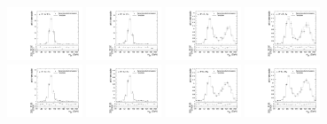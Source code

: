 \begin{figure}[htbp]
  \includegraphics[width=0.2\textwidth]{fig/analysisAppendix/templateVsReco_res_r0_MJ_mu_HP_vbf_LDy.pdf}
  \includegraphics[width=0.2\textwidth]{fig/analysisAppendix/templateVsReco_res_r0_MJ_e_HP_vbf_LDy.pdf}
  \includegraphics[width=0.2\textwidth]{fig/analysisAppendix/templateVsReco_res_r0_MJ_mu_LP_vbf_LDy.pdf}
  \includegraphics[width=0.2\textwidth]{fig/analysisAppendix/templateVsReco_res_r0_MJ_e_LP_vbf_LDy.pdf}\\
  \includegraphics[width=0.2\textwidth]{fig/analysisAppendix/templateVsReco_res_r0_MJ_mu_HP_bb_HDy.pdf}
  \includegraphics[width=0.2\textwidth]{fig/analysisAppendix/templateVsReco_res_r0_MJ_e_HP_bb_HDy.pdf}
  \includegraphics[width=0.2\textwidth]{fig/analysisAppendix/templateVsReco_res_r0_MJ_mu_LP_bb_HDy.pdf}
  \includegraphics[width=0.2\textwidth]{fig/analysisAppendix/templateVsReco_res_r0_MJ_e_LP_bb_HDy.pdf}\\

\end{figure}
